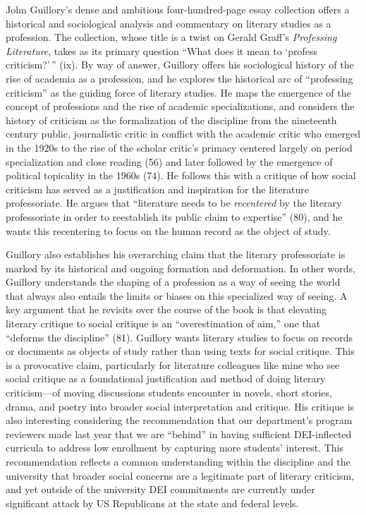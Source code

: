 \documentclass{tufte-handout}
\begin{document}
John Guillory's dense and ambitious four-hundred-page essay collection
offers a historical and sociological analysis and commentary on literary
studies as a profession. The collection, whose title is a twist on
Gerald Graff's \emph{Professing Literature}, takes as its primary
question ``What does it mean to `profess criticism?'\,'' (ix). By way of
answer, Guillory offers his sociological history of the rise of academia
as a profession, and he explores the historical arc of ``professing
criticism'' as the guiding force of literary studies. He maps the
emergence of the concept of professions and the rise of academic
specializations, and considers the history of criticism as the
formalization of the discipline from the nineteenth century public,
journalistic critic in conflict with the academic critic who emerged in
the 1920s to the rise of the scholar critic's primacy centered largely
on period specialization and close reading (56) and later followed by
the emergence of political topicality in the 1960s (74). He follows this
with a critique of how social criticism has served as a justification
and inspiration for the literature professoriate. He argues that
``literature needs to be \emph{recentered} by the literary professoriate
in order to reestablish its public claim to expertise'' (80), and he
wants this recentering to focus on the human record as the object of
study.

Guillory also establishes his overarching claim that the literary
professoriate is marked by its historical and ongoing formation and
deformation. In other words, Guillory understands the shaping of a
profession as a way of seeing the world that always also entails the
limits or biases on this specialized way of seeing. A key argument that
he revisits over the course of the book is that elevating literary
critique to social critique is an ``overestimation of aim,'' one that
``deforms the discipline'' (81). Guillory wants literary studies to
focus on records or documents as objects of study rather than using
texts for social critique. This is a provocative claim, particularly for
literature colleagues like mine who see social critique as a
foundational justification and method of doing literary criticism---of
moving discussions students encounter in novels, short stories, drama,
and poetry into broader social interpretation and critique. His critique
is also interesting considering the recommendation that our department's
program reviewers made last year that we are ``behind'' in having
sufficient DEI-inflected curricula to address low enrollment by
capturing more students' interest. This recommendation reflects a common
understanding within the discipline and the university that broader
social concerns are a legitimate part of literary criticism, and yet
outside of the university DEI commitments are currently under
significant attack by US Republicans at the state and federal levels.
\end{document}
